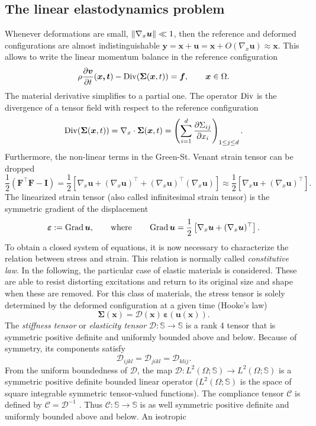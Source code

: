 \subsection{The linear elastodynamics problem}\label{sec:linElas}
Whenever deformations are small, $\left\|\nabla_x\bm{u}\right\| \ll 1$, then the reference and deformed configurations are almost indistinguishable $\bm{y} = \bm{x} + \bm{u} = \bm{x}  + O(\nabla_x\bm{u}) \approx \bm{x}$. This allows to write the linear momentum balance in the reference configuration
\begin{equation*}
	\rho \diffp{\bm{v}}{t}(\bm{x, t}) - \Div(\bm\Sigma(\bm{x}, t)) = \bm{f}, \qquad \bm{x} \in \Omega.
\end{equation*}
The material derivative simplifies to a partial one. The operator $\operatorname*{Div}$ is the divergence of a tensor field with respect to the reference configuration
\[
\Div(\bm\Sigma(\bm{x}, t)) = \nabla_x \cdot \bm\Sigma(\bm{x}, t) = \left(\sum_{i=1}^{d}\diffp{\Sigma_{ij}}{x_i}\right)_{1 \leq j \leq d}.
\]
Furthermore, the non-linear terms in the Green-St. Venant strain tensor can be dropped
\[
\frac{1}{2} (\bm{F}^\top \bm{F} - \bm{I}) = \frac{1}{2}\left[\nabla_x \bm{u} + (\nabla_x \bm{u})^\top + (\nabla_x \bm{u})^\top (\nabla_x \bm{u})\right]
\approx \frac{1}{2}\left[\nabla_x \bm{u} + (\nabla_x \bm{u})^\top\right].
\]
The linearized strain tensor (also called infinitesimal strain tensor) is the symmetric gradient of the displacement
\[
\bm{\varepsilon} := \operatorname*{Grad}\bm{u}, \qquad \text{where} \qquad \operatorname*{Grad}\bm{u} = \frac{1}{2}\left[\nabla_x \bm{u} + (\nabla_x \bm{u})^\top\right].
\]
To obtain a closed system of equations, it is now necessary to characterize the relation between stress and strain. This relation is normally called \textit{constitutive law}. In the following, the particular case of elastic materials is considered. These are able to resist distorting excitations and return to its original size and shape when these are removed. For this class of materials, the stress tensor is solely determined by the deformed configuration at a given time (Hooke's law)
\[
\bm{\Sigma}(\bm{x}) = \bm{\mathcal{D}}(\bm{x}) \, \bm{\varepsilon}(\bm{u}(\bm{x})).
\]
The \textit{stiffness tensor} or \textit{elasticity tensor} $\bm{\mathcal{D}} : \mathbb{S} \rightarrow \mathbb{S}$ is a rank 4 tensor that is symmetric positive definite and uniformly bounded above and below. Because of symmetry, its components satisfy
\[
\mathcal{D}_{ijkl} = \mathcal{D}_{jikl} = \mathcal{D}_{klij}.
\]
From the uniform boundedness of $\bm{\mathcal{D}}$, the map
$\bm{\mathcal{D}}: L^2 (\Omega; \mathbb{S}) \rightarrow L^2 (\Omega; \mathbb{S})$ is a symmetric positive definite bounded linear operator ($L^2 (\Omega; \mathbb{S})$ is the space of square integrable symmetric tensor-valued functions). The compliance tensor $\bm{\mathcal{C}}$ is defined by $\bm{\mathcal{C}} = \bm{\mathcal{D}}^{-1}$ . Thus $\bm{\mathcal{C}} : \mathbb{S} \rightarrow \mathbb{S}$ is as well symmetric positive definite and uniformly bounded above and below. An isotropic
